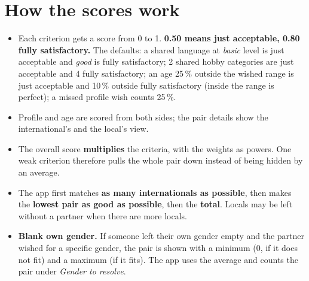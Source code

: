 \documentclass[11pt,a4paper]{article}
\begin{document}
\section{How the scores work}
\begin{itemize}[leftmargin=*]
  \item Each criterion gets a score from 0 to 1. \textbf{0.50 means just acceptable, 0.80 fully satisfactory.}
        The defaults: a shared language at \emph{basic} level is just acceptable and \emph{good} is fully
        satisfactory; 2 shared hobby categories are just acceptable and 4 fully satisfactory; an age 25\,\% outside the
        wished range is just acceptable and 10\,\% outside fully satisfactory (inside the range is perfect);
        a missed profile wish counts 25\,\%.
  \item Profile and age are scored from both sides; the pair details show the international's and the local's view.
  \item The overall score \textbf{multiplies} the criteria, with the weights as powers. One weak criterion therefore
        pulls the whole pair down instead of being hidden by an average.
  \item The app first matches \textbf{as many internationals as possible}, then makes the \textbf{lowest pair as good
        as possible}, then the \textbf{total}. Locals may be left without a partner when there are more locals.
  \item \textbf{Blank own gender.} If someone left their own gender empty and the partner wished for a specific
        gender, the pair is shown with a minimum (0, if it does not fit) and a maximum (if it fits). The app uses
        the average and counts the pair under \emph{Gender to resolve}.
\end{itemize}
\end{document}
